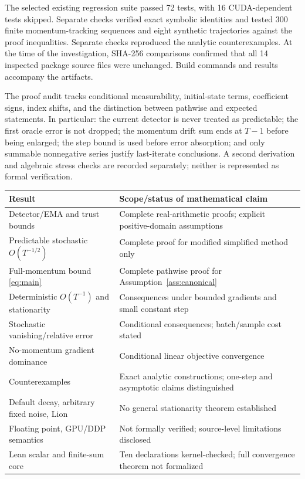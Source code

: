 \documentclass[11pt,a4paper]{article}
\theoremstyle{definition}
\theoremstyle{remark}
\begin{document}
The selected existing regression suite passed 72 tests, with 16 CUDA-dependent
tests skipped. Separate checks verified exact symbolic identities and tested
300 finite momentum-tracking sequences and eight synthetic trajectories against
the proof inequalities. Separate checks reproduced the analytic counterexamples.
At the time of the investigation, SHA-256 comparisons confirmed that all 14
inspected package source files were unchanged. Build commands and results
accompany the artifacts.

The proof audit tracks conditional measurability, initial-state terms,
coefficient signs, index shifts, and the distinction between pathwise and
expected statements. In particular: the current detector is never treated as
predictable; the first oracle error is not dropped; the momentum drift sum
ends at $T-1$ before being enlarged; the step bound is used before error
absorption; and only summable nonnegative series justify last-iterate
conclusions. A second derivation and algebraic stress checks are recorded
separately; neither is represented as formal verification.

\begin{center}\small
\begin{tabular}{p{.43\linewidth}p{.48\linewidth}}
\toprule
Result & Scope/status of mathematical claim\\
\midrule
Detector/EMA and trust bounds & Complete real-arithmetic proofs; explicit positive-domain assumptions\\
Predictable stochastic $O(T^{-1/2})$ & Complete proof for modified simplified method only\\
Full-momentum bound \eqref{eq:main} & Complete pathwise proof for Assumption~\ref{ass:canonical}\\
Deterministic $O(T^{-1})$ and stationarity & Consequences under bounded gradients and small constant step\\
Stochastic vanishing/relative error & Conditional consequences; batch/sample cost stated\\
No-momentum gradient dominance & Conditional linear objective convergence\\
Counterexamples & Exact analytic constructions; one-step and asymptotic claims distinguished\\
Default decay, arbitrary fixed noise, Lion & No general stationarity theorem established\\
Floating point, GPU/DDP semantics & Not formally verified; source-level limitations disclosed\\
Lean scalar and finite-sum core & Ten declarations kernel-checked; full convergence theorem not formalized\\
\bottomrule
\end{tabular}
\end{center}
\end{document}
